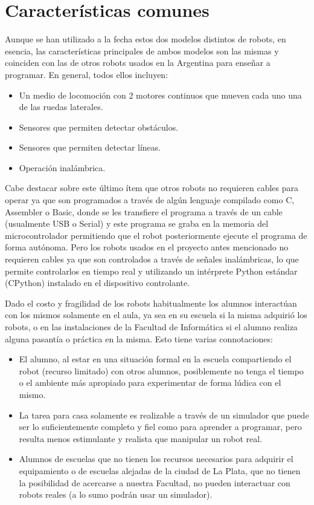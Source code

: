 \section{Características comunes}
Aunque se han utilizado a la fecha estos dos modelos distintos de robots,
en esencia, las características principales de ambos modelos son las mismas
y coinciden con las de otros robots usados en la Argentina para enseñar a
programar. En general, todos ellos incluyen:
\begin{itemize}
    \item Un medio de locomoción  con 2 motores continuos que mueven cada
        uno una de las ruedas laterales.
    \item Sensores que permiten detectar obstáculos.
    \item Sensores que permiten detectar líneas.
    \item Operación inalámbrica.
\end{itemize}

Cabe destacar sobre este último ítem que otros robots no requieren
cables para operar ya que son programados
a través de algún lenguaje compilado como C, Assembler
o Basic, donde se les transfiere el programa a través de un
cable (usualmente USB o Serial)
y este programa se graba en la memoria del microcontrolador permitiendo
que el robot posteriormente ejecute el programa de forma autónoma.
Pero los robots usados en el proyecto antes mencionado no requieren
cables ya que son controlados a través de señales
inalámbricas, lo que permite controlarlos en tiempo real y utilizando
un intérprete Python estándar (CPython) instalado en el dispositivo
controlante.

Dado el costo y fragilidad de los robots habitualmente los alumnos interactúan
con los mismos solamente en el aula, ya sea en su escuela si la misma
adquirió los robots, o en las instalaciones de la  Facultad de Informática si el alumno
realiza alguna pasantía o práctica en la misma. Esto tiene varias connotaciones:
\begin{itemize}
    \item El alumno, al estar en una situación formal en la escuela
        compartiendo el robot (recurso limitado) con otros
        alumnos, posiblemente no tenga el tiempo o el ambiente más apropiado
        para experimentar de forma lúdica con el mismo.
    \item La tarea para casa solamente es realizable a través de un simulador
        que puede ser lo suficientemente completo y fiel como para aprender
        a programar, pero resulta menos estimulante y realista que manipular
        un robot real.
    \item Alumnos de escuelas que no tienen los recursos necesarios para
        adquirir el equipamiento o de escuelas alejadas de
        la ciudad de La Plata, que
        no tienen la posibilidad de acercarse a nuestra
        Facultad, no pueden interactuar con robots reales
        (a lo sumo podrán usar un simulador).
\end{itemize}

